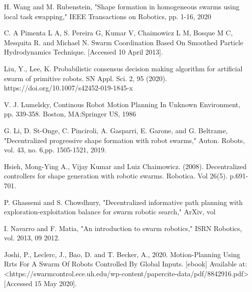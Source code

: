 \begin{thebibliography}{99}

H. Wang and M. Rubenstein, "Shape formation in homogeneous swarms using local task swapping," IEEE Transactions on Robotics, pp. 1-16, 2020

C. A Pimenta L A, S. Pereira G, Kumar V, Chaimowicz L M, Bosque M C, Mesquita R. and Michael N. Swarm Coordination Based On Smoothed Particle Hydrodynamics Technique. [Accessed 10 April 2013].

Liu, Y., Lee, K. Probabilistic consensus decision making algorithm for artificial swarm of primitive robots. SN Appl. Sci. 2, 95 (2020). https://doi.org/10.1007/s42452-019-1845-x 

V. J. Lumelsky, Continous Robot Motion Planning In Unknown Environment, pp. 339-358. Boston, MA:Springer US, 1986

G. Li, D. St-Onge, C. Pinciroli, A. Gasparri, E. Garone, and G. Beltrame, "Decentralized progressive shape formation with robot swarms," Auton. Robots, vol. 43, no. 6,pp. 1505-1521, 2019.

 
Hsieh, Mong-Ying A., Vijay Kumar and Luiz Chaimowicz. (2008). Decentralized controllers for shape generation
with robotic swarms. Robotica. Vol 26(5). p.691-701.

P. Ghassemi and S. Chowdhury, "Decentralized informative path planning with exploration-exploitation balance for swarm robotic search," ArXiv, vol

I. Navarro and F. Matia, "An introduction to swarm robotics," ISRN Robotics, vol. 2013, 09 2012.

Joshi, P., Leclerc, J., Bao, D. and T. Becker, A., 2020. Motion-Planning Using Rrts For A Swarm Of Robots Controlled By Global Inputs. [ebook] Available at: <https://swarmcontrol.ece.uh.edu/wp-content/papercite-data/pdf/8842916.pdf> [Accessed 15 May 2020].
\end{thebibliography}


